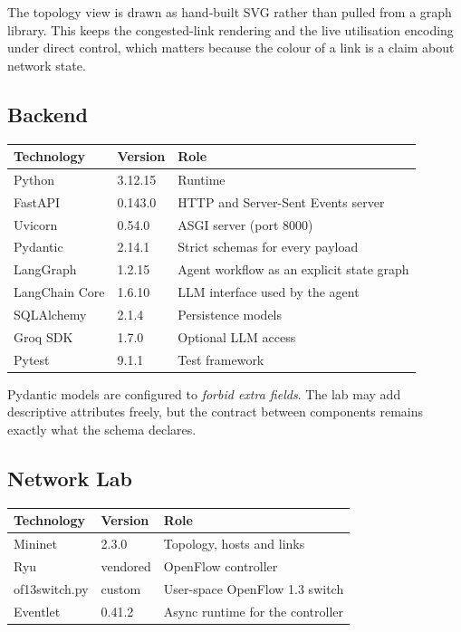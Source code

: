 \documentclass[12pt,a4paper]{report}
\begin{document}
The topology view is drawn as hand-built SVG rather than pulled from a graph
library. This keeps the congested-link rendering and the live utilisation
encoding under direct control, which matters because the colour of a link is a
claim about network state.

\subsection{Backend}

\begin{center}
\begin{tabular}{@{}L{3.2cm}L{2.8cm}L{7.8cm}@{}}
\toprule
\textbf{Technology} & \textbf{Version} & \textbf{Role} \\
\midrule
Python           & 3.12.15 & Runtime \\
FastAPI          & 0.143.0 & HTTP and Server-Sent Events server \\
Uvicorn          & 0.54.0  & ASGI server (port 8000) \\
Pydantic         & 2.14.1  & Strict schemas for every payload \\
LangGraph        & 1.2.15  & Agent workflow as an explicit state graph \\
LangChain Core   & 1.6.10  & LLM interface used by the agent \\
SQLAlchemy       & 2.1.4   & Persistence models \\
Groq SDK         & 1.7.0   & Optional LLM access \\
Pytest           & 9.1.1   & Test framework \\
\bottomrule
\end{tabular}
\end{center}

Pydantic models are configured to \emph{forbid extra fields}. The lab may add
descriptive attributes freely, but the contract between components remains
exactly what the schema declares.

\subsection{Network Lab}

\begin{center}
\begin{tabular}{@{}L{3.2cm}L{2.8cm}L{7.8cm}@{}}
\toprule
\textbf{Technology} & \textbf{Version} & \textbf{Role} \\
\midrule
Mininet          & 2.3.0   & Topology, hosts and links \\
Ryu              & vendored & OpenFlow controller \\
of13switch.py    & custom  & User-space OpenFlow 1.3 switch \\
Eventlet         & 0.41.2  & Async runtime for the controller \\
\bottomrule
\end{tabular}
\end{center}
\end{document}
